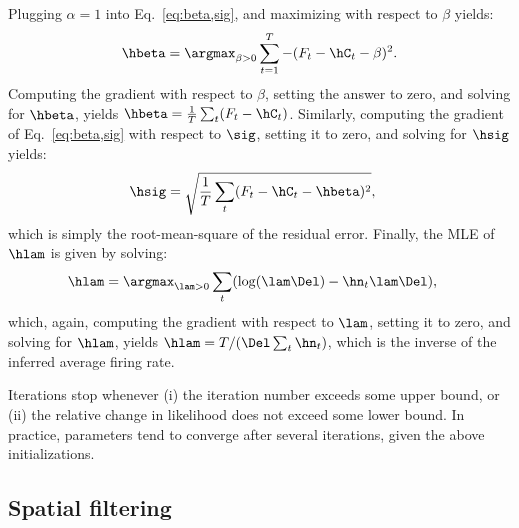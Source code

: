 Plugging $\alpha=1$ into Eq.~\eqref{eq:beta,sig}, and maximizing with respect to $\beta$ yields:
\begin{align}
\hbeta = \argmax_{\beta>0} \sum_{t=1}^T -(F_t - \hC_t - \beta)^2.
\end{align}
\noindent Computing the gradient with respect to $\beta$, setting the answer to zero, and solving for $\hbeta$, yields $\hbeta = \frac{1}{T} \sum_t (F_t-\hC_t)$.  Similarly, computing the gradient of Eq.~\eqref{eq:beta,sig} with respect to $\sig$, setting it to zero, and solving for $\hsig$ yields:
\begin{align}
\hsig &= \sqrt{\frac{1}{T} \sum_t (F_t - \hC_t - \hbeta)^2},
\end{align}
which is simply the root-mean-square of the residual error.  Finally, the MLE of $\hlam$ is given by solving:
\begin{align}
\hlam &= \argmax_{\lam>0} \sum_t (\log (\lam \Del) - \hn_t \lam \Del),
\end{align}
which, again, computing the gradient with respect to $\lam$, setting it to zero, and solving for $\hlam$, yields $\hlam=T/ (\Del \sum_t \hn_t)$, which is the inverse of the inferred average firing rate.


Iterations stop whenever (i) the iteration number exceeds some upper bound, or (ii) the relative change in likelihood does not exceed some lower bound.  In practice, parameters tend to converge after several iterations, given the above initializations. 


\subsection{Spatial filtering} \label{sec:methods:spatial}

